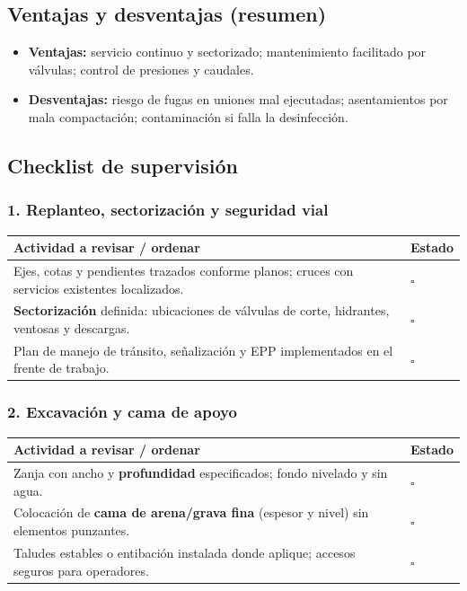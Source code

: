\documentclass[12pt]{article}
\newcommand{\cbox}{\(\square\)}
\renewcommand{\cbox}{\(\square\)} %
\begin{document}
	\subsection*{Ventajas y desventajas (resumen)}
	\begin{itemize}[leftmargin=*, itemsep=2pt]
		\item \textbf{Ventajas:} servicio continuo y sectorizado; mantenimiento facilitado por válvulas; control de presiones y caudales.
		\item \textbf{Desventajas:} riesgo de fugas en uniones mal ejecutadas; asentamientos por mala compactación; contaminación si falla la desinfección.
	\end{itemize}
	
	\subsection{Checklist de supervisión}
	
	\subsubsection*{1. Replanteo, sectorización y seguridad vial}
	\begin{tabularx}{\linewidth}{>{\raggedright\arraybackslash}p{0.93\linewidth} >{\centering\arraybackslash}m{0.07\linewidth}}
		\toprule
		\textbf{Actividad a revisar / ordenar} & \textbf{Estado}\\
		\midrule
		Ejes, cotas y pendientes trazados conforme planos; cruces con servicios existentes localizados. & \cbox \\
		\textbf{Sectorización} definida: ubicaciones de válvulas de corte, hidrantes, ventosas y descargas. & \cbox \\
		Plan de manejo de tránsito, señalización y EPP implementados en el frente de trabajo. & \cbox \\
		\bottomrule
	\end{tabularx}
	
	\subsubsection*{2. Excavación y cama de apoyo}
	\begin{tabularx}{\linewidth}{>{\raggedright\arraybackslash}p{0.93\linewidth} >{\centering\arraybackslash}m{0.07\linewidth}}
		\toprule
		\textbf{Actividad a revisar / ordenar} & \textbf{Estado}\\
		\midrule
		Zanja con ancho y \textbf{profundidad} especificados; fondo nivelado y sin agua. & \cbox \\
		Colocación de \textbf{cama de arena/grava fina} (espesor y nivel) sin elementos punzantes. & \cbox \\
		Taludes estables o entibación instalada donde aplique; accesos seguros para operadores. & \cbox \\
		\bottomrule
	\end{tabularx}
	
\end{document}
